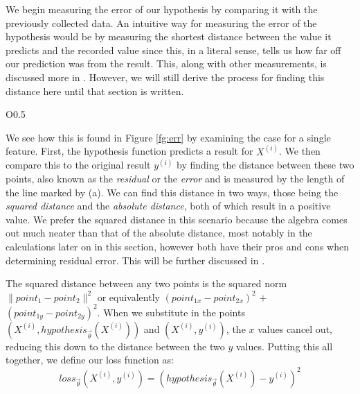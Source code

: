 We begin measuring the error of our hypothesis by comparing it with the
previously collected data.  An intuitive way for measuring the  error of the
hypothesis would be by measuring the shortest distance between the value it
predicts and the recorded value since this, in a literal sense, tells us how far
off our prediction was from the result. This, along with other measurements,
is discussed more in \placeholder. However, we will still derive the process for
finding this distance here until that section is written.

\begin{wrapfigure}{O}{0.5\textwidth}
    \centering
    \caption{Visual representation of the distance between expected and actual
    results.}
    \label{fg:err}
\end{wrapfigure}

We see how this is found in Figure \ref{fg:err} by examining the case for a
single feature. First, the hypothesis function predicts a result for $X^{(i)}$.
We then compare this to the original result $y^{(i)}$ by finding the distance
between these two points, also known as the \emph{residual} or the \emph{error}
and is measured by the length of the line marked by (a). We can find this
distance in two ways, those being the \emph{squared distance} and the
\emph{absolute distance}, both of which result in a positive value. We prefer
the squared distance in this scenario because the algebra comes out much neater
than that of the absolute distance, most notably in the calculations later on in
this section, however both have their pros and cons when determining residual
error. This will be further discussed in \placeholder.

The squared distance between any two points is the squared norm $\| point_1 -
point_2 \|^2$ or equivalently $(point_{1x}-point_{2x})^2$ $+$
$(point_{1y}-point_{2y})^2$. When we substitute in the points $(X^{(i)},
hypothesis_{\vec\theta}(X^{(i)}))$ and $(X^{(i)}, y^{(i)})$, the $x$ values cancel
out, reducing this down to the distance between the two $y$ values. Putting this
all together, we define our loss function as:
\begin{equation}
    loss_{\vec\theta}(X^{(i)}, y^{(i)}) = (hypothesis_{\vec\theta}(X^{(i)}) - y^{(i)})^2
\end{equation}

